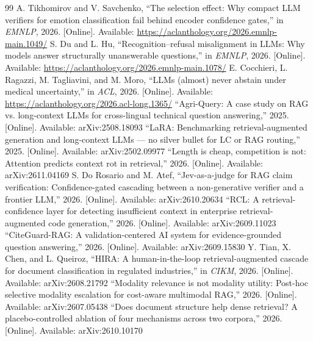 \documentclass[conference]{IEEEtran}
\begin{document}
\begin{thebibliography}{99}
 A. Tikhomirov and V. Savchenko, ``The selection effect: Why compact LLM verifiers for emotion classification fail behind encoder confidence gates,'' in \emph{EMNLP}, 2026. [Online]. Available: \url{https://aclanthology.org/2026.emnlp-main.1049/}
 S. Du and L. Hu, ``Recognition--refusal misalignment in LLMs: Why models answer structurally unanswerable questions,'' in \emph{EMNLP}, 2026. [Online]. Available: \url{https://aclanthology.org/2026.emnlp-main.1078/}
 E. Cocchieri, L. Ragazzi, M. Tagliavini, and M. Moro, ``LLMs (almost) never abstain under medical uncertainty,'' in \emph{ACL}, 2026. [Online]. Available: \url{https://aclanthology.org/2026.acl-long.1365/}
 ``Agri-Query: A case study on RAG vs. long-context LLMs for cross-lingual technical question answering,'' 2025. [Online]. Available: arXiv:2508.18093
 ``LaRA: Benchmarking retrieval-augmented generation and long-context LLMs --- no silver bullet for LC or RAG routing,'' 2025. [Online]. Available: arXiv:2502.09977
 ``Length is cheap, competition is not: Attention predicts context rot in retrieval,'' 2026. [Online]. Available: arXiv:2611.04169
 S. Do Rosario and M. Atef, ``Jev-as-a-judge for RAG claim verification: Confidence-gated cascading between a non-generative verifier and a frontier LLM,'' 2026. [Online]. Available: arXiv:2610.20634
 ``RCL: A retrieval-confidence layer for detecting insufficient context in enterprise retrieval-augmented code generation,'' 2026. [Online]. Available: arXiv:2609.11023
 ``CiteGuard-RAG: A validation-centered AI system for evidence-grounded question answering,'' 2026. [Online]. Available: arXiv:2609.15830
 Y. Tian, X. Chen, and L. Queiroz, ``HIRA: A human-in-the-loop retrieval-augmented cascade for document classification in regulated industries,'' in \emph{CIKM}, 2026. [Online]. Available: arXiv:2608.21792
 ``Modality relevance is not modality utility: Post-hoc selective modality escalation for cost-aware multimodal RAG,'' 2026. [Online]. Available: arXiv:2607.05438
 ``Does document structure help dense retrieval? A placebo-controlled ablation of four mechanisms across two corpora,'' 2026. [Online]. Available: arXiv:2610.10170


\end{thebibliography}
\end{document}
